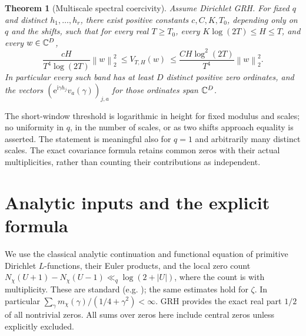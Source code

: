 \documentclass[11pt]{article}
\newtheorem{theorem}{Theorem}[section]
\theoremstyle{remark}\newtheorem{remark}[theorem]{Remark}
\newcommand{\ii}{\mathrm i}\newcommand{\e}{\mathrm e}\newcommand{\ph}{\varphi}
\newcommand{\norm}[1]{\left\lVert #1\right\rVert}\newcommand{\abs}[1]{\left|#1\right|}
\begin{document}
\begin{theorem}[Multiscale spectral coercivity]\label{thm:main}
Assume Dirichlet GRH. For fixed $q$ and distinct $h_1,\dots,h_r$, there exist positive constants $c,C,K,T_0$, depending only on $q$ and the shifts, such that for every real $T\ge T_0$, every $K\log(2T)\le H\le T$, and every $w\in\mathbb C^D$,
\begin{equation}\label{eq:main}
 \boxed{\quad \frac{cH}{T^4\log(2T)}\norm{w}_2^2\ \le V_{T,H}(w)\ \le
 \frac{CH\log^2(2T)}{T^4}\norm{w}_2^2.\quad}
\end{equation}
In particular every such band has at least $D$ distinct positive zero ordinates, and the vectors $(\e^{\ii\gamma h_j}v_a(\gamma))_{j,a}$ for those ordinates span $\mathbb C^D$.
\end{theorem}
The short-window threshold is logarithmic in height for fixed modulus and scales; no uniformity in $q$, in the number of scales, or as two shifts approach equality is asserted. The statement is meaningful also for $q=1$ and arbitrarily many distinct scales. The exact covariance formula retains common zeros with their actual multiplicities, rather than counting their contributions as independent.

\section{Analytic inputs and the explicit formula}
We use the classical analytic continuation and functional equation of primitive Dirichlet $L$-functions, their Euler products, and the local zero count $N_\chi(U+1)-N_\chi(U-1)\ll_q\log(2+|U|)$, where the count is with multiplicity. These are standard (e.g. \cite{mv,banks}); the same estimates hold for $\zeta$. In particular $\sum_\gamma m_\chi(\gamma)/(1/4+\gamma^2)<\infty$. GRH provides the exact real part $1/2$ of all nontrivial zeros. All sums over zeros here include central zeros unless explicitly excluded.
\end{document}
